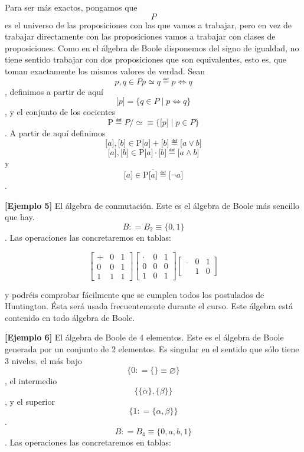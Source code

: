 \begin{enumerate}
  Para ser más exactos, pongamos que \[P\] es el universo de las
  proposiciones con las que vamos a trabajar, pero en vez de trabajar
  directamente con las proposiciones vamos a trabajar con clases de
  proposiciones. Como en el álgebra de Boole disponemos del signo de
  igualdad, no tiene sentido trabajar con dos proposiciones que son
  equivalentes, esto es, que toman exactamente los mismos valores de
  verdad. Sean \[p,{q \in P}{p \simeq q} ≝ p\Leftrightarrow q\],
  definimos a partir de aquí
  \[{\lbrack p\rbrack} = {\{{{q \in P} \mid p\Leftrightarrow q}\}}\], y
  el conjunto de los cocientes
  \[\mathtt{\mathrm{P}} ≝ {{{P/} \simeq} \equiv {\{{{\lbrack p\rbrack} \mid {p \in P}}\}}}\].
  A partir de aquí definimos
  \[{\lbrack a\rbrack},{{\lbrack b\rbrack} \in \mathtt{\mathrm{P}}}{{\lbrack a\rbrack} + {\lbrack b\rbrack}} ≝ {\lbrack{a \vee b}\rbrack}\]
  \[{\lbrack a\rbrack},{{\lbrack b\rbrack} \in \mathtt{\mathrm{P}}}{{\lbrack a\rbrack} \cdot {\lbrack b\rbrack}} ≝ {\lbrack{a \land b}\rbrack}\]y
  \[{{\lbrack a\rbrack} \in \mathtt{\mathrm{P}}}\overline{\lbrack a\rbrack} ≝ {\lbrack{\neg a}\rbrack}\].

  \textbf{{[}Ejemplo 5{]}} El álgebra de conmutación. Este es el álgebra
  de Boole más sencillo que hay. \[B{{: = B_{2}} \equiv {\{{0,1}\}}}\].
  Las operaciones las concretaremos en tablas:

  \[\begin{bmatrix}
   + & 0 & 1 \\
  0 & 0 & 1 \\
  1 & 1 & 1
  \end{bmatrix}\begin{bmatrix}
   \cdot & 0 & 1 \\
  0 & 0 & 0 \\
  1 & 0 & 1
  \end{bmatrix}\begin{bmatrix}
  \overline{} & 0 & 1 \\
   & 1 & 0
  \end{bmatrix}\]

  y podréis comprobar fácilmente que se cumplen todos los postulados de
  Huntington. Ésta será usada frecuentemente durante el curso. Este
  álgebra está contenido en todo álgebra de Boole.

  \textbf{{[}Ejemplo 6{]}} El álgebra de Boole de 4 elementos. Este es
  el álgebra de Boole generada por un conjunto de 2 elementos. Es
  singular en el sentido que sólo tiene 3 niveles, el más bajo
  \[\{{0{{: = {\{\}}} \equiv \varnothing}}\}\], el intermedio
  \[\{{{\{\alpha\}},{\{\beta\}}}\}\], y el superior
  \[\{{1{: = {\{{\alpha,\beta}\}}}}\}\].
  \[B{{: = B_{4}} \equiv {\{{0,a,b,1}\}}}\]. Las operaciones las
  concretaremos en tablas:


\end{enumerate}
